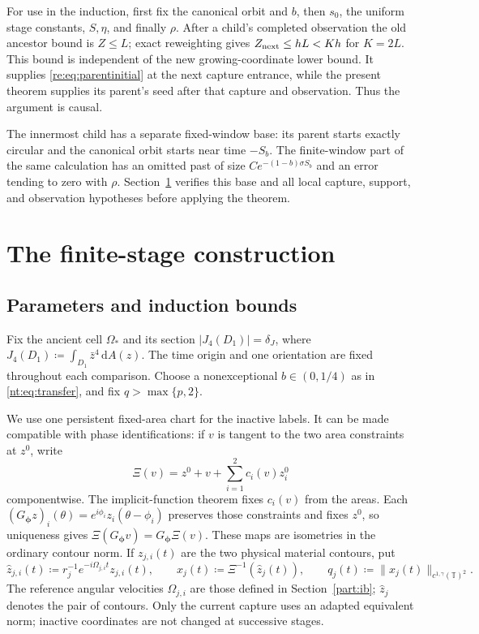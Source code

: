 \documentclass[11pt]{amsart}
\theoremstyle{remark}
\numberwithin{equation}{section}
\newcommand{\T}{\mathbb T}
\newcommand{\dd}{\,\mathrm d}
\begin{document}
For use in the induction, first fix the canonical orbit and $b$, then
$s_0$, the uniform stage constants, $S,\eta$, and finally $\rho$.
After a child's completed observation the old ancestor bound is $Z\leq L$;
exact reweighting gives $Z_{\rm next}\leq hL<Kh$ for $K=2L$.
This bound is independent of the new growing-coordinate lower bound.
It supplies \eqref{re:eq:parentinitial} at the next capture entrance,
while the present theorem supplies its parent's seed after that capture
and observation. Thus the argument is causal.

The innermost child has a separate fixed-window base: its parent starts
exactly circular and the canonical orbit starts near time $-S_b$.
The finite-window part of the same calculation has an omitted past
of size $Ce^{-(1-b)\sigma S_b}$ and an error tending to zero with
$\rho$. Section~\ref{part:fi} verifies this base and all local
capture, support, and observation hypotheses before applying the theorem.


\section{The finite-stage construction}\label{part:fi}
\subsection{Parameters and induction bounds}\label{dep:section}
Fix the ancient cell $\Omega_*$ and its section
$|J_4(D_1)|=\delta_J$, where $J_4(D_1)\coloneqq\int_{D_1}\bar z^4\dd A(z)$.
The time origin and one orientation are fixed throughout each
comparison. Choose a nonexceptional $b\in(0,1/4)$ as in
\eqref{nt:eq:transfer}, and fix $q>\max\{p,2\}$.

We use one persistent fixed-area chart for the inactive labels.
It can be made compatible with phase identifications:
if $v$ is tangent to the two area constraints at $z^0$, write
\[
 \Xi(v)=z^0+v+\sum_{i=1}^2c_i(v)z_i^0
\]
componentwise. The implicit-function theorem fixes $c_i(v)$
from the areas. Each
$(G_{\boldsymbol\phi}z)_i(\theta)
=e^{i\phi_i}z_i(\theta-\phi_i)$ preserves those constraints and
fixes $z^0$, so uniqueness gives
$\Xi(G_{\boldsymbol\phi}v)=G_{\boldsymbol\phi}\Xi(v)$.
These maps are isometries in the ordinary contour norm.
If $z_{j,i}(t)$ are the two physical material contours, put
\begin{equation}\label{fi:def:coordinates}
 \widehat z_{j,i}(t)\coloneqq
    r_j^{-1}e^{-i\Omega_{j,i}t}z_{j,i}(t),\qquad
 x_j(t)\coloneqq\Xi^{-1}(\widehat z_j(t)),\qquad
 q_j(t)\coloneqq\|x_j(t)\|_{c^{1,\gamma}(\T)^2}.
\end{equation}
The reference angular velocities $\Omega_{j,i}$ are those defined
in Section~\ref{part:ib}; $\widehat z_j$ denotes the pair of contours.
Only the current capture uses an adapted equivalent norm;
inactive coordinates are not changed at successive stages.
\end{document}
